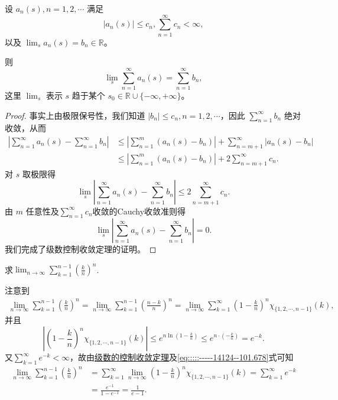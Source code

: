 \documentclass[../../main.tex]{subfiles}
\begin{document}
\begin{theorem}[级数的控制收敛定理]\label{theorem:级数的控制收敛定理}
设 \( a_n(s), n = 1, 2, \cdots \) 满足
\[
|a_n(s)| \leqslant c_n, \sum_{n = 1}^{\infty} c_n < \infty,
\]
以及 \( \lim_{s} a_n(s) = b_n \in \mathbb{R} \)。

则
\[
\lim_{s} \sum_{n = 1}^{\infty} a_n(s) = \sum_{n = 1}^{\infty} b_n,
\]
这里 \( \lim_{s} \) 表示 \( s \) 趋于某个 \( s_0 \in \mathbb{R} \cup \{-\infty, +\infty\} \)。
\end{theorem}
\begin{proof}
事实上由极限保号性，我们知道 \( |b_n| \leqslant c_n, n = 1, 2, \cdots \)，因此 \( \sum_{n = 1}^{\infty} b_n \) 绝对收敛，从而
\begin{align*}
\left| \sum_{n = 1}^{\infty} a_n(s) - \sum_{n = 1}^{\infty} b_n \right| &\leqslant \left| \sum_{n = 1}^{m} (a_n(s) - b_n) \right| + \sum_{n = m + 1}^{\infty} |a_n(s) - b_n| \\
&\leqslant \left| \sum_{n = 1}^{m} (a_n(s) - b_n) \right| + 2 \sum_{n = m + 1}^{\infty} c_n.
\end{align*}
对 \( s \) 取极限得
\[
\lim_{s} \left| \sum_{n = 1}^{\infty} a_n(s) - \sum_{n = 1}^{\infty} b_n \right| \leqslant 2 \sum_{n = m + 1}^{\infty} c_n.
\]
由 \( m \) 任意性及$\sum_{n=1}^{\infty}{c_n}$收敛的Cauchy收敛准则得
\[
\lim_{s} \left| \sum_{n = 1}^{\infty} a_n(s) - \sum_{n = 1}^{\infty} b_n \right| = 0.
\]
我们完成了级数控制收敛定理的证明。
\end{proof}

\begin{example}
求$\lim_{n\rightarrow \infty}\sum_{k=1}^{n-1}\left( \frac{k}{n} \right) ^n$.
\end{example}
\begin{solution}
注意到
\begin{align}
\lim_{n\rightarrow \infty}\sum_{k=1}^{n-1}\left( \frac{k}{n} \right) ^n=\lim_{n\rightarrow \infty}\sum_{k=1}^{n-1}\left( \frac{n-k}{n} \right) ^n\nonumber=\lim_{n\rightarrow \infty}\sum_{k=1}^{\infty}\left( 1-\frac{k}{n} \right) ^n\chi _{\{1,2,\cdots ,n-1\}}(k),\label{eq:::::-----14124--101.678}
\end{align}
并且
\[
\left| \left( 1-\frac{k}{n} \right) ^n\chi _{\{1,2,\cdots ,n-1\}}(k) \right|\leqslant e^{n\ln \left( 1-\frac{k}{n} \right)}\leqslant e^{n\cdot \left( -\frac{k}{n} \right)}=e^{-k}.
\]
又$\sum_{k=1}^{\infty}e^{-k}<\infty$，故由\hyperref[theorem:级数的控制收敛定理]{级数的控制收敛定理}及\eqref{eq:::::-----14124--101.678}式可知
\begin{align*}
\lim_{n\rightarrow \infty}\sum_{k=1}^{n-1}\left( \frac{k}{n} \right) ^n&=\sum_{k=1}^{\infty}\lim_{n\rightarrow \infty}\left( 1-\frac{k}{n} \right) ^n\chi _{\{1,2,\cdots ,n-1\}}(k)=\sum_{k=1}^{\infty}e^{-k}
\\
&=\frac{e^{-1}}{1-e^{-1}}=\frac{1}{e-1}.
\end{align*}
\end{solution}
\end{document}
